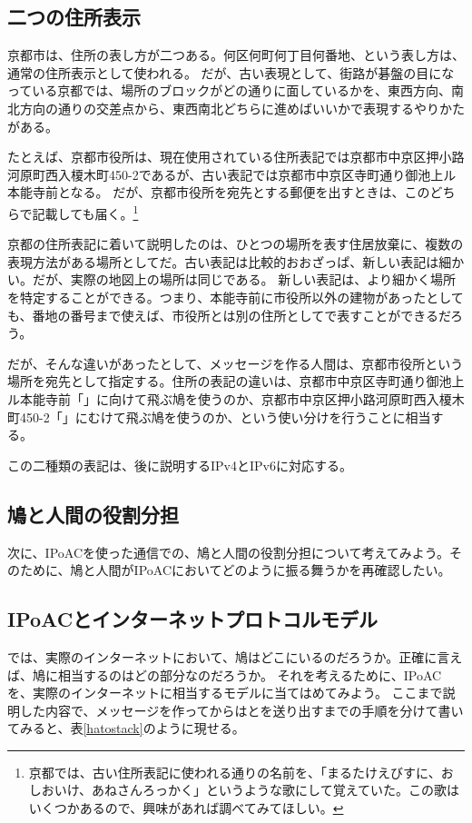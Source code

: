 \subsection{二つの住所表示}

京都市は、住所の表し方が二つある。何区何町何丁目何番地、という表し方は、通常の住所表示として使われる。
だが、古い表現として、街路が碁盤の目になっている京都では、場所のブロックがどの通りに面しているかを、東西方向、南北方向の通りの交差点から、東西南北どちらに進めばいいかで表現するやりかたがある。

たとえば、京都市役所は、現在使用されている住所表記では京都市中京区押小路河原町西入榎木町450-2であるが、古い表記では京都市中京区寺町通り御池上ル本能寺前となる。
だが、京都市役所を宛先とする郵便を出すときは、このどちらで記載しても届く。\footnote{京都では、古い住所表記に使われる通りの名前を、「まるたけえびすに、おしおいけ、あねさんろっかく」というような歌にして覚えていた。この歌はいくつかあるので、興味があれば調べてみてほしい。}

京都の住所表記に着いて説明したのは、ひとつの場所を表す住居放棄に、複数の表現方法がある場所としてだ。古い表記は比較的おおざっぱ、新しい表記は細かい。だが、実際の地図上の場所は同じである。
新しい表記は、より細かく場所を特定することができる。つまり、本能寺前に市役所以外の建物があったとしても、番地の番号まで使えば、市役所とは別の住所としてで表すことができるだろう。

だが、そんな違いがあったとして、メッセージを作る人間は、京都市役所という場所を宛先として指定する。住所の表記の違いは、京都市中京区寺町通り御池上ル本能寺前「」に向けて飛ぶ鳩を使うのか、京都市中京区押小路河原町西入榎木町450-2「」にむけて飛ぶ鳩を使うのか、という使い分けを行うことに相当する。

この二種類の表記は、後に説明するIPv4とIPv6に対応する。



\subsection{鳩と人間の役割分担}
次に、IPoACを使った通信での、鳩と人間の役割分担について考えてみよう。そのために、鳩と人間がIPoACにおいてどのように振る舞うかを再確認したい。





\subsection{IPoACとインターネットプロトコルモデル}
では、実際のインターネットにおいて、鳩はどこにいるのだろうか。正確に言えば、鳩に相当するのはどの部分なのだろうか。
それを考えるために、IPoACを、実際のインターネットに相当するモデルに当てはめてみよう。
ここまで説明した内容で、メッセージを作ってからはとを送り出すまでの手順を分けて書いてみると、表\ref{hatostack}のように現せる。

